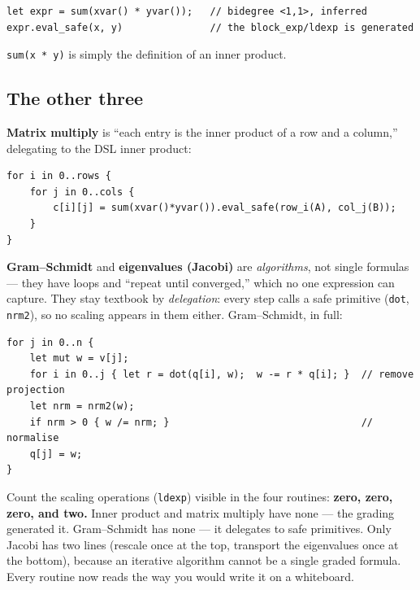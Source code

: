 \documentclass[11pt]{article}
\newcommand{\code}[1]{\texttt{#1}}
\begin{document}
\begin{center}
\begin{BVerbatim}
let expr = sum(xvar() * yvar());   // bidegree <1,1>, inferred
expr.eval_safe(x, y)               // the block_exp/ldexp is generated
\end{BVerbatim}
\end{center}

\code{sum(x * y)} is simply the definition of an inner product.

\subsection{The other three}

\textbf{Matrix multiply} is ``each entry is the inner product of a row and a
column,'' delegating to the DSL inner product:

\begin{center}
\begin{BVerbatim}
for i in 0..rows {
    for j in 0..cols {
        c[i][j] = sum(xvar()*yvar()).eval_safe(row_i(A), col_j(B));
    }
}
\end{BVerbatim}
\end{center}

\textbf{Gram--Schmidt} and \textbf{eigenvalues (Jacobi)} are \emph{algorithms},
not single formulas --- they have loops and ``repeat until converged,'' which no
one expression can capture. They stay textbook by \emph{delegation}: every step
calls a safe primitive (\code{dot}, \code{nrm2}), so no scaling appears in them
either. Gram--Schmidt, in full:

\begin{center}
\begin{BVerbatim}
for j in 0..n {
    let mut w = v[j];
    for i in 0..j { let r = dot(q[i], w);  w -= r * q[i]; }  // remove projection
    let nrm = nrm2(w);
    if nrm > 0 { w /= nrm; }                                 // normalise
    q[j] = w;
}
\end{BVerbatim}
\end{center}

\begin{keyidea}
Count the scaling operations (\code{ldexp}) visible in the four routines:
\textbf{zero, zero, zero, and two.} Inner product and matrix multiply have none
--- the grading generated it. Gram--Schmidt has none --- it delegates to safe
primitives. Only Jacobi has two lines (rescale once at the top, transport the
eigenvalues once at the bottom), because an iterative algorithm cannot be a
single graded formula. Every routine now reads the way you would write it on a
whiteboard.
\end{keyidea}
\end{document}
